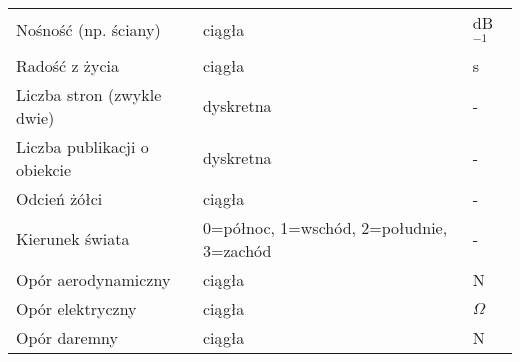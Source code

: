\begin{table}[ht]
\begin{tabular}{p{4cm}p{2.5cm}p{1.5cm}}
Nośność (np. ściany)            & ciągła                                & dB$^{-1}$\\
Radość z życia                  & ciągła                                & s\\
Liczba stron (zwykle dwie)      & dyskretna                             & -\\
Liczba publikacji o obiekcie    & dyskretna                             & -\\
Odcień żółci                    & ciągła                                & -\\
Kierunek świata                 & 0=północ, 1=wschód, 2=południe, \mbox{3=zachód}  & -\\
Opór aerodynamiczny             & ciągła                                & N\\
Opór elektryczny                & ciągła                                & $\Omega$\\
Opór daremny                    & ciągła                                & N\\
\hline
\end{tabular}
\end{table}




